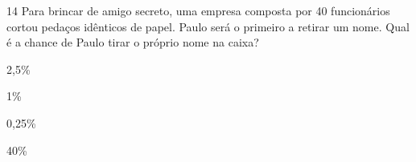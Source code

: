











\num{14} Para brincar de amigo secreto, uma empresa composta por 40
funcionários cortou pedaços idênticos de papel. Paulo será o primeiro a
retirar um nome. Qual é a chance de Paulo tirar o próprio nome na caixa?

\begin{multicols}{2}
\begin{escolha}
\item 2,5\%
\item 1\%
\item 0,25\%
\item 40\%
\end{escolha}
\end{multicols}







